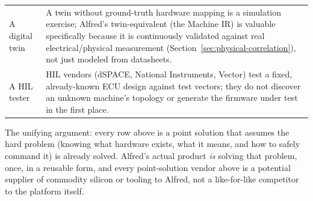 \begin{center}
\begin{tabularx}{\linewidth}{@{}p{2.6cm} X@{}}
A digital twin & A twin without ground-truth hardware mapping is a simulation exercise; Alfred's twin-equivalent (the Machine IR) is valuable specifically because it is continuously validated against real electrical/physical measurement (Section~\ref{sec:physical-correlation}), not just modeled from datasheets. \\
A HIL tester & HIL vendors (dSPACE, National Instruments, Vector) test a fixed, already-known ECU design against test vectors; they do not discover an unknown machine's topology or generate the firmware under test in the first place. \\
\bottomrule
\end{tabularx}
\end{center}

The unifying argument: every row above is a point solution that assumes the hard problem (knowing what hardware exists, what it means, and how to safely command it) is already solved. Alfred's actual product \emph{is} solving that problem, once, in a reusable form, and every point-solution vendor above is a potential supplier of commodity silicon or tooling to Alfred, not a like-for-like competitor to the platform itself.
